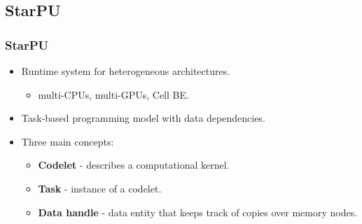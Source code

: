 \subsection{StarPU}
\begin{frame}
  \frametitle{StarPU}
  \begin{itemize}
  \item Runtime system for heterogeneous architectures.
    \begin{itemize}
    \item multi-CPUs, multi-GPUs, Cell BE.
    \end{itemize}

  \item Task-based programming model with data dependencies.

  \item Three main concepts:
    \begin{itemize}
    \item {\bf Codelet}  - describes a computational kernel.
    \item {\bf Task} - instance of a codelet.
    \item {\bf Data handle} - data entity that keeps track of copies over memory nodes.
    \end{itemize}
  \end{itemize}
\end{frame}
%
